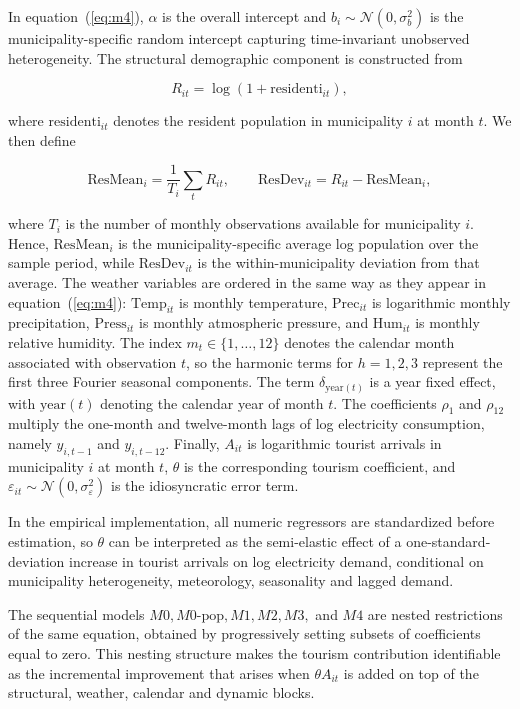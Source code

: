 \documentclass[11pt,a4paper]{article}
\begin{document}
In equation~(\ref{eq:m4}), $\alpha$ is the overall intercept and $b_i \sim \mathcal{N}(0,\sigma_b^2)$ is the municipality-specific random intercept capturing time-invariant unobserved heterogeneity. The structural demographic component is constructed from

$$
R_{it} = \log(1 + \mathrm{residenti}_{it}),
$$

where $\mathrm{residenti}_{it}$ denotes the resident population in municipality $i$ at month $t$. We then define

$$
\text{ResMean}_{i} = \frac{1}{T_i}\sum_t R_{it}, \qquad \text{ResDev}_{it} = R_{it} - \text{ResMean}_{i},
$$

where $T_i$ is the number of monthly observations available for municipality $i$. Hence, $\text{ResMean}_{i}$ is the municipality-specific average log population over the sample period, while $\text{ResDev}_{it}$ is the within-municipality deviation from that average. The weather variables are ordered in the same way as they appear in equation~(\ref{eq:m4}): $\text{Temp}_{it}$ is monthly temperature, $\text{Prec}_{it}$ is logarithmic monthly precipitation, $\text{Press}_{it}$ is monthly atmospheric pressure, and $\text{Hum}_{it}$ is monthly relative humidity. The index $m_t \in \{1,\dots,12\}$ denotes the calendar month associated with observation $t$, so the harmonic terms for $h=1,2,3$ represent the first three Fourier seasonal components. The term $\delta_{\text{year}(t)}$ is a year fixed effect, with $\text{year}(t)$ denoting the calendar year of month $t$. The coefficients $\rho_1$ and $\rho_{12}$ multiply the one-month and twelve-month lags of log electricity consumption, namely $y_{i,t-1}$ and $y_{i,t-12}$. Finally, $A_{it}$ is logarithmic tourist arrivals in municipality $i$ at month $t$, $\theta$ is the corresponding tourism coefficient, and $\varepsilon_{it} \sim \mathcal{N}(0,\sigma_\varepsilon^2)$ is the idiosyncratic error term.

In the empirical implementation, all numeric regressors are standardized before estimation, so $\theta$ can be interpreted as the semi-elastic effect of a one-standard-deviation increase in tourist arrivals on log electricity demand, conditional on municipality heterogeneity, meteorology, seasonality and lagged demand.

The sequential models $M0, M0\text{-pop}, M1, M2, M3,$ and $M4$ are nested restrictions of the same equation, obtained by progressively setting subsets of coefficients equal to zero. This nesting structure makes the tourism contribution identifiable as the incremental improvement that arises when $\theta A_{it}$ is added on top of the structural, weather, calendar and dynamic blocks.
\end{document}
